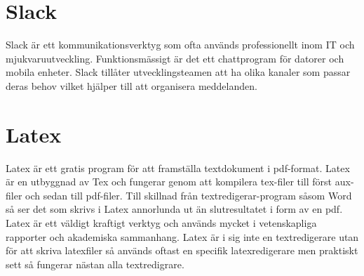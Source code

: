 \section{Slack}
Slack är ett kommunikationsverktyg som ofta används professionellt inom IT och mjukvaruutveckling.\cite{Slack} Funktionsmässigt är det ett chattprogram för datorer och mobila enheter. Slack tillåter utvecklingsteamen att ha olika kanaler som passar deras behov vilket hjälper till att organisera meddelanden.

\section{Latex}
Latex är ett gratis program för att framställa textdokument i pdf-format. Latex är en utbyggnad av Tex och fungerar genom att kompilera tex-filer till först aux-filer och sedan till pdf-filer. Till skillnad från textredigerar-program såsom Word så ser det som skrivs i Latex annorlunda ut än slutresultatet i form av en pdf. Latex är ett väldigt kraftigt verktyg och används mycket i vetenskapliga rapporter och akademiska sammanhang.\cite{ctan} Latex är i sig inte en textredigerare utan för att skriva latexfiler så används oftast en specifik latexredigerare men praktiskt sett så fungerar nästan alla textredigrare.
